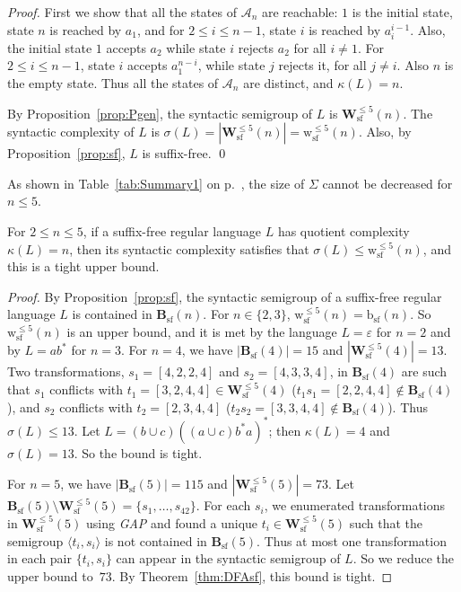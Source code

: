\documentclass{llncs}
\renewcommand{\le}{\leqslant}
\newcommand{\eps}{\varepsilon}
\newcommand{\Sig}{\Sigma}
\newcommand{\cA}{{\mathcal A}}
\newcommand{\Bsf}{\mathbf{B}_{\mathrm{sf}}}
\newcommand{\Vsf}{\mathbf{W}^{\le 5}_{\mathrm{sf}}}
\newcommand{\bsf}{{\mathrm{b}_{\mathrm{sf}}}}
\newcommand{\vsf}{{\mathrm{w}^{\le 5}_{\mathrm{sf}}}}
\begin{document}
\begin{proof}
First we show that all the states of $\cA_n$ are reachable: $1$ is the initial state,  state $n$ is reached by $a_1$, and for $2 \leq i \leq n-1$, state $i$ is reached by $a_i^{i-1}$. 
Also, the initial state $1$ accepts $a_2$ while state $i$ rejects $a_2$ for all $i \neq 1$. 
For $2 \leq i \leq n-1$,  state $i$ accepts $ a_1^{n-i}$, while state $j$ rejects it, for all $j \neq i$. Also $n$ is the empty state. Thus all the states of $\cA_n$ are distinct, and $\kappa(L) = n$.


By Proposition~\ref{prop:Pgen}, the syntactic semigroup of $L$ is $\Vsf(n)$. The syntactic complexity of $L$ is $\sigma(L) = |\Vsf(n)| = \vsf(n)$. Also, by Proposition~\ref{prop:sf}, $L$ is suffix-free. \qed
\end{proof}

As shown in Table~\ref{tab:Summary1} on p.~\pageref{table1}, the size of $\Sig$ cannot be decreased for $n\le 5$. 


\begin{theorem}\label{thm:sfsmall} 
For $2 \le n \le 5$, if a suffix-free regular language $L$ has quotient complexity $\kappa(L) = n$, then its syntactic complexity satisfies that $\sigma(L) \le \vsf(n)$, and this is a tight upper bound. 
\end{theorem}

\begin{proof} 
By Proposition~\ref{prop:sf}, the syntactic semigroup of a suffix-free regular language $L$ is contained in $\Bsf(n)$. 
For $n\in\{2,3\}$, $\vsf(n)=\bsf(n)$. 
So $\vsf(n)$ is an upper bound, and it is met by the language $L = \eps$ for $n = 2$ and by $L = ab^*$ for $n = 3$. 
For $n=4$, we have $|\Bsf(4)| = 15$ and $|\Vsf(4)| = 13$. 
Two transformations, $s_1 = [4, 2, 2, 4]$ and $s_2 = [4, 3, 3, 4]$, in $\Bsf(4)$ are such that $s_1$ conflicts with $t_1 = [3, 2, 4, 4] \in \Vsf(4)$ ($t_1s_1 = [2,2,4,4] \not\in \Bsf(4)$), and $s_2$ conflicts with $t_2 = [2,3,4,4]$ ($t_2s_2 = [3,3,4,4] \not\in \Bsf(4)$). 
Thus $\sigma(L) \le 13$. 
Let $L = (b \cup c)((a \cup c)b^*a)^*$; then $\kappa(L) = 4$ and $\sigma(L) = 13$. So the bound is tight.

For $n=5$, we have $|\Bsf(5)| = 115$ and $|\Vsf(5)| = 73$. Let $\Bsf(5) \setminus \Vsf(5) = \{s_1,\ldots,s_{42}\}$. For each $s_i$, we enumerated transformations in $\Vsf(5)$ using \emph{GAP} and found a unique $t_i \in \Vsf(5)$ such that the semigroup $\langle t_i, s_i \rangle$ is not contained in $\Bsf(5)$. Thus at most one transformation in each pair $\{t_i,s_i\}$ can appear in the syntactic semigroup of $L$. So we reduce the upper bound to~$73$. By Theorem~\ref{thm:DFAsf}, this bound is tight. 
\end{proof}
\smallskip
\end{document}
